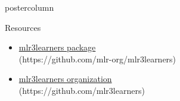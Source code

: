 \documentclass{beamer}
\begin{document}
\begin{withoutheader}
\begin{frame}[fragile]{}
\begin{columns}
\begin{column}{.245\textwidth}
\begin{beamercolorbox}[center]{postercolumn}
\begin{minipage}{.98\textwidth}
{\begin{myblock}{Resources}
\begin{itemize}
								\item \href{https://github.com/mlr-org/mlr3learners}{mlr3learners package}\\ (https://github.com/mlr-org/mlr3learners)
								\item \href{https://github.com/mlr3learners}{mlr3learners organization}\\ (https://github.com/mlr3learners)
							\end{itemize}
						\end{myblock}
					\vfill}
				\end{minipage}
			\end{beamercolorbox}
		\end{column}
	\end{columns}
\end{frame}
\end{withoutheader}
\end{document}
